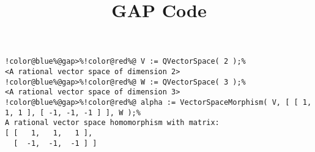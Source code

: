 \documentclass[12pt]{amsart}
\title{GAP Code}
\author{}
\begin{document}
\maketitle

\begin{Verbatim}[commandchars=!@\%,frame=single]
!color@blue%@gap>%!color@red%@ V := QVectorSpace( 2 );%
<A rational vector space of dimension 2>
!color@blue%@gap>%!color@red%@ W := QVectorSpace( 3 );%
<A rational vector space of dimension 3>
!color@blue%@gap>%!color@red%@ alpha := VectorSpaceMorphism( V, [ [ 1, 1, 1 ], [ -1, -1, -1 ] ], W );%
A rational vector space homomorphism with matrix: 
[ [   1,   1,   1 ],
  [  -1,  -1,  -1 ] ]
\end{Verbatim}
\end{document}

